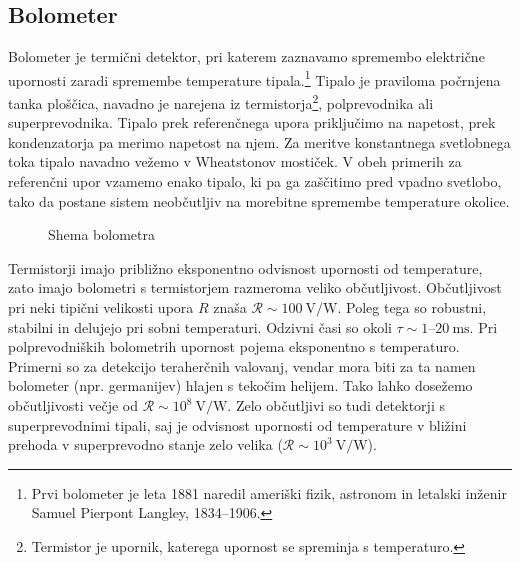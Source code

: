 \subsection*{Bolometer}
Bolometer je termični detektor, pri katerem zaznavamo spremembo 
električne upornosti
zaradi spremembe temperature tipala.\footnote{Prvi bolometer je leta 1881 naredil
ameriški fizik, astronom in letalski inženir Samuel Pierpont Langley, 1834--1906.}
Tipalo je praviloma počrnjena tanka ploščica, 
navadno je narejena iz termistorja\footnote{Termistor je upornik, katerega
upornost se spreminja s temperaturo.}, 
polprevodnika ali superprevodnika. Tipalo prek
referenčnega upora priključimo na napetost, prek kondenzatorja pa merimo napetost na njem.
Za meritve konstantnega svetlobnega toka tipalo navadno vežemo v Wheatstonov mostiček. V obeh
primerih za referenčni upor vzamemo enako tipalo, ki pa ga zaščitimo pred vpadno svetlobo, 
tako da postane sistem neobčutljiv na morebitne spremembe temperature okolice.
\begin{figure}[h!]
\centering
\def\svgwidth{75truemm} 

\caption{Shema bolometra}
\label{fig:Bolometer-shema}
\end{figure}

Termistorji imajo približno eksponentno odvisnost upornosti od temperature, zato imajo bolometri
s termistorjem razmeroma veliko občutljivost. Občutljivost pri neki tipični
velikosti upora $R$ znaša $\mathcal{R}\sim 100~\si{\volt/\watt}$. Poleg tega so 
robustni, stabilni in delujejo pri sobni temperaturi. Odzivni časi so okoli 
$\tau \sim 1$--$20~\si{\milli\second}$. 
Pri polprevodniških bolometrih upornost pojema eksponentno s temperaturo. 
Primerni so za detekcijo teraherčnih valovanj, 
vendar mora biti za ta namen bolometer (npr. germanijev) hlajen s tekočim helijem. 
Tako lahko dosežemo občutljivosti večje od $\mathcal{R} \sim 10^8~\si{\volt/\watt}$. Zelo 
občutljivi so tudi detektorji s superprevodnimi tipali, saj je odvisnost upornosti 
od temperature v bližini prehoda v superprevodno stanje zelo velika 
($\mathcal{R} \sim 10^3~\si{\volt/\watt}$).

